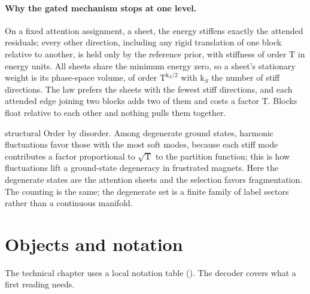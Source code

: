 \paragraph{Why the gated mechanism stops at one level.}
On a fixed attention assignment, a sheet, the energy stiffens exactly the attended residuals; every other
direction, including any rigid translation of one block relative to another, is held only by the reference
prior, with stiffness of order \(\mathrm T\) in energy units. All sheets share the minimum energy zero, so a
sheet's stationary weight is its phase-space volume, of order \(\mathrm T^{\mathrm k_S/2}\) with \(\mathrm k_S\)
the number of stiff directions. The law prefers the sheets with the fewest stiff directions, and each
attended edge joining two blocks adds two of them and costs a factor \(\mathrm T\). Blocks float relative to
each other and nothing pulls them together.

\begin{analogy}{structural}
Order by disorder. Among degenerate ground states, harmonic fluctuations favor those with the most soft
modes, because each stiff mode contributes a factor proportional to \(\sqrt{\mathrm T}\) to the partition
function; this is how fluctuations lift a ground-state degeneracy in frustrated magnets. Here the
degenerate states are the attention sheets and the selection favors fragmentation. The counting is the
same; the degenerate set is a finite family of label sectors rather than a continuous manifold.
\end{analogy}

\section{Objects and notation}
\label{comp:ch13-notation}

The technical chapter uses a local notation table (). The decoder covers
what a first reading needs.

